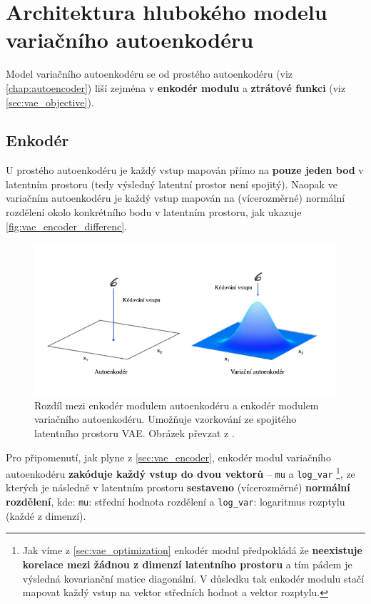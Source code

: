 \section{Architektura hlubokého modelu variačního autoenkodéru}
Model variačního autoenkodéru se od prostého autoenkodéru (viz \autoref{chap:autoencoder}) liší zejména v \textbf{enkodér modulu} a \textbf{ztrátové funkci} (viz \autoref{sec:vae_objective}).
\subsection{Enkodér}
U prostého autoenkodéru je každý vstup mapován přímo na \textbf{pouze jeden bod} v latentním prostoru (tedy výsledný latentní prostor není spojitý).
Naopak ve variačním autoenkodéru je každý vstup mapován na (vícerozměrné) normální rozdělení okolo konkrétního bodu v latentním prostoru, jak ukazuje \autoref{fig:vae_encoder_differenc}.

\begin{figure}[H]
    \centering
    \includegraphics[width=\textwidth]{figures/vae_encoder_module.png}
    \caption{Rozdíl mezi enkodér modulem autoenkodéru a enkodér modulem variačního autoenkodéru. Umožňuje vzorkování ze spojitého latentního prostoru VAE. Obrázek převzat z \textcite{Foster2023}.}
    \label{fig:vae_encoder_difference}
\end{figure}

Pro připomenutí, jak plyne z \autoref{sec:vae_encoder}, enkodér modul variačního autoenkodéru \textbf{zakóduje každý vstup do dvou vektorů} – \lstinline{mu} a \lstinline{log_var}
\footnote{Jak víme z \autoref{sec:vae_optimization} enkodér modul předpokládá že \textbf{neexistuje korelace mezi žádnou z dimenzí latentního prostoru} a tím pádem je výsledná kovarianční matice diagonální. V důsledku tak enkodér modulu stačí mapovat každý vstup na vektor středních hodnot a vektor rozptylu.},
ze kterých je následně v latentním prostoru \textbf{sestaveno} (vícerozměrné) \textbf{normální rozdělení}, kde:
\lstinline{mu}: střední hodnota rozdělení a \lstinline{log_var}: logaritmus rozptylu (každé z dimenzí).

